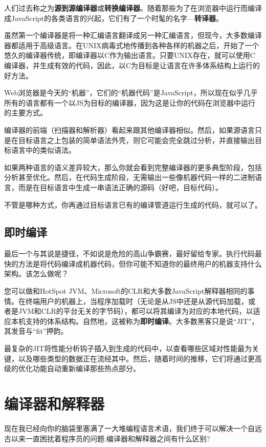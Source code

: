 \documentclass[cn,11pt,chinese]{elegantbook}
\begin{document}
人们过去称之为\textbf{源到源编译器}或\textbf{转换编译器}。随着那些为了在浏览器中运行而编译成JavaScript的各类语言的兴起，它们有了一个时髦的名字—\textbf{转译器}。

虽然第一个编译器是将一种汇编语言翻译成另一种汇编语言，但现今，大多数编译器都适用于高级语言。在UNIX病毒式地传播到各种各样的机器之后，开始了一个悠久的编译器传统，即编译器以C作为输出语言。只要UNIX存在，就可以使用C编译器，并生成有效的代码，因此，以C为目标是让语言在许多体系结构上运行的好方法。

Web浏览器是今天的“机器”，它们的“机器代码”是JavaScript，所以现在似乎几乎所有的语言都有一个以JS为目标的编译器，因为这是让你的代码在浏览器中运行的主要方式。

编译器的前端（扫描器和解析器）看起来跟其他编译器相似。然后，如果源语言只是在目标语言之上包装的简单语法外壳，则它可能会完全跳过分析，并直接输出目标语言中的类似语法。

如果两种语言的语义差异较大，那么你就会看到完整编译器的更多典型阶段，包括分析甚至优化。然后，在代码生成阶段，无需输出一些像机器代码一样的二进制语言，而是在目标语言中生成一串语法正确的源码（好吧，目标代码）。

不管是哪种方式，你再通过目标语言已有的编译管道运行生成的代码，就可以了。

\subsection{即时编译}

最后一个与其说是捷径，不如说是危险的高山争霸赛，最好留给专家。执行代码最快的方法是将代码编译成机器代码，但你可能不知道你的最终用户的机器支持什么架构。该怎么做呢？

您可以做和HotSpot JVM、Microsoft的CLR和大多数JavaScript解释器相同的事情。在终端用户的机器上，当程序加载时（无论是从JS中还是从源代码加载，或者是JVM和CLR的平台无关的字节码），都可以将其编译为对应的本地代码，以适应本机支持的体系结构。自然地，这被称为\textbf{即时编译}。大多数黑客只是说“JIT”，其发音与“fit”押韵。

最复杂的JIT将性能分析钩子插入到生成的代码中，以查看哪些区域对性能最为关键，以及哪些类型的数据正在流经其中。然后，随着时间的推移，它们将通过更高级的优化功能自动重新编译那些热点部分。

\section{编译器和解释器}

现在我已经向你的脑袋里塞满了一大堆编程语言术语，我们终于可以解决一个自远古以来一直困扰着程序员的问题:编译器和解释器之间有什么区别?
\end{document}
